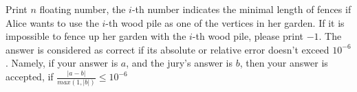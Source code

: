 Print $n$ floating number, the $i$-th number indicates the minimal length of 
fences if Alice wants to use the $i$-th  wood pile as one of the vertices in 
her garden.
If it is impossible to fence up her garden with the $i$-th wood pile, 
please print $-1$.
The answer is considered as correct if its absolute or relative error 
doesn't exceed $10^{−6}$.
Namely, if your answer is $a$, and the jury's answer is $b$, 
then your answer is accepted, if $\frac{|a-b|}{max(1,|b|)}\leq 10^{-6}$


